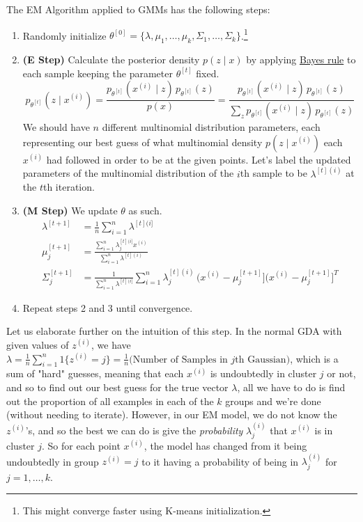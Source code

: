 \documentclass{article}
\begin{document}
  \begin{algo}
    The EM Algorithm applied to GMMs has the following steps:

    \begin{enumerate}
      \item Randomly initialize $\theta^{[0]} = \{\lambda, \mu_1, \ldots, \mu_k, \Sigma_1, \ldots, \Sigma_k\}$.\footnote{This might converge faster using K-means initialization.} 

      \item \textbf{(E Step)} Calculate the posterior density $p(z \mid x)$ by applying \hyperref[prob-thm:bayes-rule]{Bayes rule} to each sample keeping the parameter $\theta^{[t]}$ fixed. 
      \begin{equation}
        p_{\theta^{[t]}} (z \mid x^{(i)}) = \frac{p_{\theta^{[t]}} (x^{(i)} \mid z) \, p_{\theta^{[t]}}(z)}{p(x)} = \frac{p_{\theta^{[t]}} (x^{(i)} \mid z) \, p_{\theta^{[t]}}(z)}{\sum_z p_{\theta^{[t]}} (x^{(i)} \mid z) \, p_{\theta^{[t]}}(z)}
      \end{equation}
      We should have $n$ different multinomial distribution parameters, each representing our best guess of what multinomial density $p(z \mid x^{(i)})$ each $x^{(i)}$ had followed in order to be at the given points. Let's label the updated parameters of the multinomial distribution of the $i$th sample to be $\lambda^{[t](i)}$ at the $t$th iteration. 

      \item \textbf{(M Step)} We update $\theta$ as such. 
      \begin{align}
        \lambda^{[t+1]}  & = \frac{1}{n} \sum_{i=1}^n \lambda^{[t](i]} \\
        \mu_j^{[t+1]} & = \frac{\sum_{i=1}^n \lambda^{[t](i]}_j x^{(i)}}{\sum_{i=1}^n \lambda^{[t](i)}} \\ 
        \Sigma_j^{[t+1]} & = \frac{1}{\sum_{i=1}^n \lambda^{[t](i]}} \sum_{i=1}^n \lambda^{[t](i)}_j \,\big(x^{(i)} - \mu_j^{[t+1]} \big]\big(x^{(i)} - \mu_j^{[t+1]} \big]^T
      \end{align}

      \item Repeat steps 2 and 3 until convergence. 
    \end{enumerate}
  \end{algo}

  Let us elaborate further on the intuition of this step. In the normal GDA with given values of $z^{(i)}$, we have $\lambda= \frac{1}{n} \sum_{i=1}^n 1\{z^{(i)} = j\} = \frac{1}{n}\big(\text{Number of Samples in }j\text{th Gaussian}\big)$, which is a sum of "hard" guesses, meaning that each $x^{(i)}$ is undoubtedly in cluster $j$ or not, and so to find out our best guess for the true vector $\lambda$, all we have to do is find out the proportion of all examples in each of the $k$ groups and we're done (without needing to iterate). However, in our EM model, we do not know the $z^{(i)}$'s, and so the best we can do is give the \textit{probability} $\lambda^{(i)}_j$ that $x^{(i)}$ is in cluster $j$. So for each point $x^{(i)}$, the model has changed from it being undoubtedly in group $z^{(i)} = j$ to it having a probability of being in $\lambda^{(i)}_j$ for $j = 1, \ldots, k$.
\end{document}
